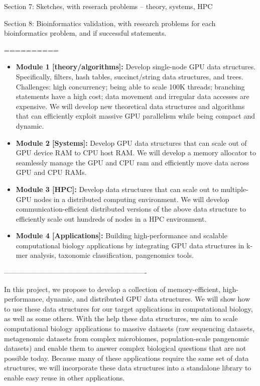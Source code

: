 Section 7: Sketches, with reserach problems -- theory, systems, HPC

Section 8: Bioinformatics validation, with research problems for each bioinformatics problem, and if successful statements.

\iffalse
==========



\begin{itemize}[noitemsep, leftmargin=*]
  \item {\bf Module 1 [theory/algorithms]:} Develop single-node GPU data structures.
    Specifically, filters, hash tables, succinct/string data structures, and
    trees. Challenges: high concurrency; being able to scale 100K threads;
    branching statements have a high cost; data movement and irregular data
    accesses are expensive. We will develop new theoretical data structures and
    algorithms that can efficiently exploit massive GPU parallelism while being
    compact and dynamic.

  \item {\bf Module 2 [Systems]:} Develop GPU data structures that can scale out of
      GPU device RAM to CPU host RAM. We will develop a memory allocator to
      seamlessly manage the GPU and CPU ram and efficiently move data across GPU
      and CPU RAMs.

    \item {\bf Module 3 [HPC]:} Develop data structures that can scale out to
      multiple-GPU nodes in a distributed computing environment. We will develop
      communication-efficient distributed versions of the above data structure
      to efficiently scale out hundreds of nodes in a HPC environment.

    \item {\bf Module 4 [Applications]:} Building high-performance and scalable
      computational biology applications by integrating GPU data structures in
      k-mer analysis, taxonomic classification, pangenomics tools.

\end{itemize}

-------------------------------------------------------------

In this project, we propose to develop a  collection of
memory-efficient, high-performance, dynamic, and distributed GPU data structures.
We will show how to use these data structures for our target applications in computational biology, as well as some others.
With the help these data structures, we aim to scale computational biology applications to massive datasets (raw sequencing datasets, metagenomic datasets from complex microbiomes, population-scale pangenomic datasets) and enable them to answer complex biological questions that are not possible today.
Because many of these applications require the same set of data structures, we will incorporate these data structures into a standalone library to enable easy reuse in other applications.

